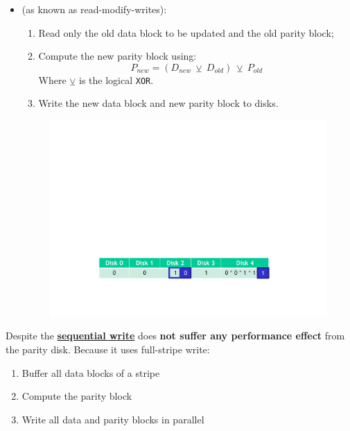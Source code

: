 \begin{itemize}
    \item {} (as known as read-modify-writes):
    \begin{enumerate}
        \item Read only the old data block to be updated and the old parity block;
        \item Compute the new parity block using:
        \begin{equation*}
            P_{new} = \left(D_{new} \:\veebar\: D_{old}\right) \:\veebar\: P_{old}
        \end{equation*}
        Where $\veebar$ is the logical \texttt{XOR}.
        \item Write the new data block and new parity block to disks.
    \end{enumerate}
    \begin{figure}[!htp]
        \centering
        \includegraphics[width=.8\textwidth]{img/raid-8.pdf}
    \end{figure}
\end{itemize}
Despite the \textbf{\underline{sequential write}} does \textbf{not suffer any performance effect} from the parity disk. Because it uses full-stripe write:
\begin{enumerate}
    \item Buffer all data blocks of a stripe
    \item Compute the parity block
    \item Write all data and parity blocks in parallel\cite{raid-and-data-integrity-slides}
\end{enumerate}


